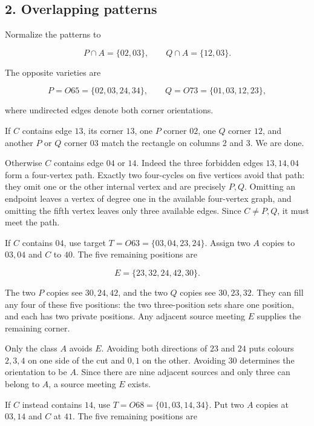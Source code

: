 \documentclass[
  10pt,
]{article}
\begin{document}
\hypertarget{overlapping-patterns}{%
\subsection*{2. Overlapping patterns}\label{overlapping-patterns}}

Normalize the patterns to

\[
P\cap A=\{02,03\},\qquad Q\cap A=\{12,03\}.
\]

The opposite varieties are

\[
P=O65=\{02,03,24,34\},\qquad
Q=O73=\{01,03,12,23\},
\]

where undirected edges denote both corner orientations.

If \(C\) contains edge \(13\), its corner \(13\), one \(P\) corner
\(02\), one \(Q\) corner \(12\), and another \(P\) or \(Q\) corner
\(03\) match the rectangle on columns 2 and 3. We are done.

Otherwise \(C\) contains edge \(04\) or \(14\). Indeed the three
forbidden edges \(13,14,04\) form a four-vertex path. Exactly two
four-cycles on five vertices avoid that path: they omit one or the other
internal vertex and are precisely \(P,Q\). Omitting an endpoint leaves a
vertex of degree one in the available four-vertex graph, and omitting
the fifth vertex leaves only three available edges. Since \(C\ne P,Q\),
it must meet the path.

If \(C\) contains \(04\), use target \(T=O63=\{03,04,23,24\}\). Assign
two \(A\) copies to \(03,04\) and \(C\) to \(40\). The five remaining
positions are

\[
E=\{23,32,24,42,30\}.
\]

The two \(P\) copies see \(30,24,42\), and the two \(Q\) copies see
\(30,23,32\). They can fill any four of these five positions: the two
three-position sets share one position, and each has two private
positions. Any adjacent source meeting \(E\) supplies the remaining
corner.

Only the class \(A\) avoids \(E\). Avoiding both directions of \(23\)
and \(24\) puts colours \(2,3,4\) on one side of the cut and \(0,1\) on
the other. Avoiding \(30\) determines the orientation to be \(A\). Since
there are nine adjacent sources and only three can belong to \(A\), a
source meeting \(E\) exists.

If \(C\) instead contains \(14\), use \(T=O68=\{01,03,14,34\}\). Put two
\(A\) copies at \(03,14\) and \(C\) at \(41\). The five remaining
positions are
\end{document}

